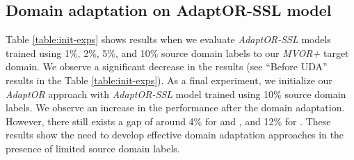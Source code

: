 {\blue \subsection{Domain adaptation on AdaptOR-SSL model}
Table \ref{table:init-exps} shows results when we evaluate \emph{AdaptOR-SSL} models trained using 1\%, 2\%, 5\%, and 10\% source domain labels to our \emph{MVOR+} target domain. We observe a significant decrease in the results (see ``Before UDA'' results in the Table \ref{table:init-exps}). As a final experiment, we initialize our \emph{AdaptOR} approach with \emph{AdaptOR-SSL} model trained using 10\% source domain labels. We observe an increase in the performance after the domain adaptation. However, there still exists a gap of around 4\% for \emph{} and \emph{}, and 12\% for \emph{}. These results show the need to develop effective domain adaptation approaches in the presence of limited source domain labels.}



























































































%
